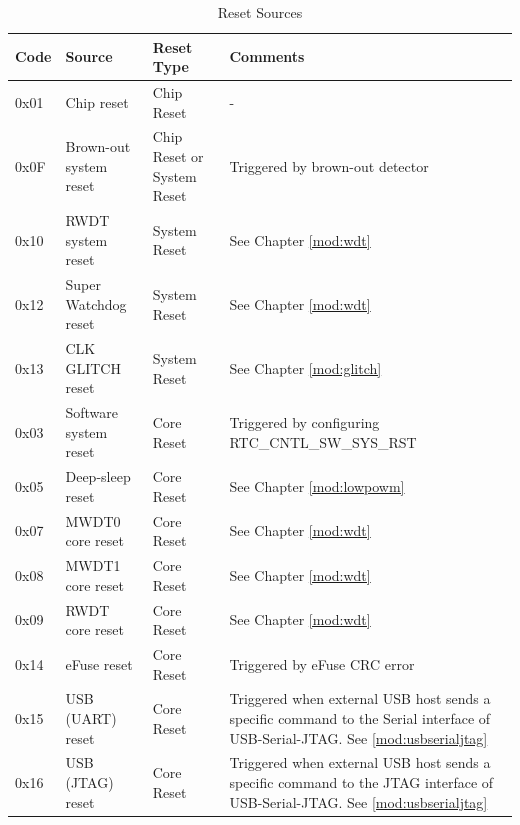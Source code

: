 \documentclass[main\_\_EN.tex]{subfiles}
\begin{document}
\begin{table}[H]
    \centering
    \caption{Reset Sources}
    \label{tab:resclk-reset-src}
    \begin{threeparttable}
    \begin{tabular}{ | l | m{3.7cm} | m{2.1cm} | m{8.9cm} | }
    \hline
        \rowcolor{lightgray}
        \textbf{Code} & \textbf{Source} & \textbf{Reset Type} &   \textbf{Comments} \\\hline
        0x01 & Chip reset\tnote{1}  & Chip Reset  & -\\
        \hline
        0x0F & Brown-out system reset  & Chip Reset or System Reset  & Triggered by brown-out detector\tnote{2}\\
        \hline
        0x10 & RWDT system reset  & System Reset  & See Chapter  \ref{mod:wdt} \textit{\nameref{mod:wdt}}
        \\\hline
        0x12 & Super Watchdog reset & System Reset & See Chapter  \ref{mod:wdt} \textit{\nameref{mod:wdt}}
        \\\hline
        0x13 & CLK GLITCH reset  & System Reset  & See Chapter  \ref{mod:glitch} \textit{\nameref{mod:glitch}}
        \\\hline
        0x03 & Software system reset & Core Reset  & Triggered by configuring  RTC\_CNTL\_SW\_SYS\_RST \\
        \hline
        0x05 & Deep-sleep reset  & Core Reset  & See Chapter  \ref{mod:lowpowm} \textit{\nameref{mod:lowpowm}}
        \\\hline
        0x07 & MWDT0 core reset & Core Reset  & See Chapter  \ref{mod:wdt} \textit{\nameref{mod:wdt}}
        \\\hline
        0x08 & MWDT1 core reset & Core Reset  & See Chapter  \ref{mod:wdt} \textit{\nameref{mod:wdt}}
        \\\hline
        0x09 & RWDT core reset  & Core Reset & See Chapter  \ref{mod:wdt} \textit{\nameref{mod:wdt}}
        \\\hline
        0x14 & eFuse reset & Core Reset  & Triggered by eFuse CRC error
        \\\hline
        0x15 & USB (UART) reset & Core Reset & Triggered when external USB host sends a specific command to the Serial interface of USB-Serial-JTAG. See \ref{mod:usbserialjtag} \textit{\nameref{mod:usbserialjtag}} \\\hline
        0x16 & USB (JTAG) reset & Core Reset & Triggered when external USB host sends a specific command to the JTAG interface of USB-Serial-JTAG. See \ref{mod:usbserialjtag} \textit{\nameref{mod:usbserialjtag}}\\\hline


\end{tabular}
\end{threeparttable}
\end{table}
\end{document}
